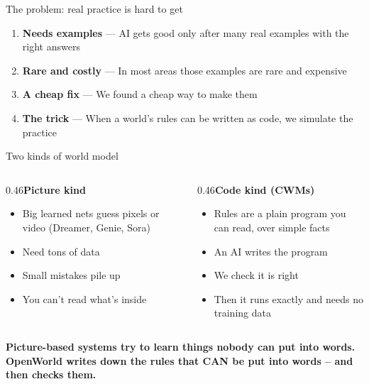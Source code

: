 \documentclass[aspectratio=169,11pt]{beamer}
\begin{document}
\begin{frame}{The problem: real practice is hard to get}\vfill\begin{enumerate}\item \textbf{Needs examples} --- AI gets good only after many real examples with the right answers\item \textbf{Rare and costly} --- In most areas those examples are rare and expensive\item \textbf{A cheap fix} --- We found a cheap way to make them\item \textbf{The trick} --- When a world's rules can be written as code, we simulate the practice\end{enumerate}\vfill\end{frame}
\begin{frame}{Two kinds of world model}\vfill
\begin{columns}[T]
\begin{column}{0.46\textwidth}{\color{owmuted}\bfseries\large Picture kind}\par\medskip\begin{itemize}\small \item Big learned nets guess pixels or video (Dreamer, Genie, Sora)
\item Need tons of data
\item Small mistakes pile up
\item You can't read what's inside\end{itemize}\end{column}
\begin{column}{0.46\textwidth}{\color{owteal}\bfseries\large Code kind (CWMs)}\par\medskip\begin{itemize}\small \item Rules are a plain program you can read, over simple facts
\item An AI writes the program
\item We check it is right
\item Then it runs exactly and needs no training data\end{itemize}\end{column}
\end{columns}\vfill\end{frame}
\begin{frame}[plain]\centering\vfill
{\color{owdeep}\bfseries\LARGE Picture-based systems try to learn things nobody can put into words. OpenWorld writes down the rules that CAN be put into words -- and then checks them.\par}\vfill\end{frame}
\end{document}

